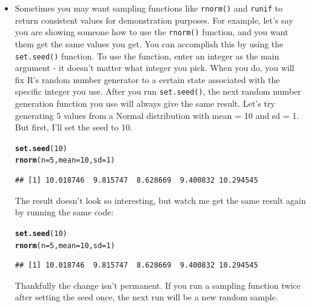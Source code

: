 \documentclass{tufte-book}\usepackage[]{graphicx}\usepackage[]{color}
\makeatletter
\newcommand{\hlnum}[1]{\textcolor[rgb]{0.686,0.059,0.569}{#1}}%
\newcommand{\hlstd}[1]{\textcolor[rgb]{0.345,0.345,0.345}{#1}}%
\newcommand{\hlkwc}[1]{\textcolor[rgb]{0.333,0.667,0.333}{#1}}%
\newcommand{\hlkwd}[1]{\textcolor[rgb]{0.737,0.353,0.396}{\textbf{#1}}}%
\newenvironment{kframe}{%
 \def\at@end@of@kframe{}%
 \ifinner\ifhmode%
  \def\at@end@of@kframe{\end{minipage}}%
  \begin{minipage}{\columnwidth}%
 \fi\fi%
 \def\FrameCommand##1{\hskip\@totalleftmargin \hskip-\fboxsep
 \colorbox{shadecolor}{##1}\hskip-\fboxsep
     \hskip-\linewidth \hskip-\@totalleftmargin \hskip\columnwidth}%
 \MakeFramed {\advance\hsize-\width
   \@totalleftmargin\z@ \linewidth\hsize
   \@setminipage}}%
 {\par\unskip\endMakeFramed%
 \at@end@of@kframe}
\newenvironment{knitrout}{}{} %
\makeatother
\begin{document}
\begin{itemize}


\item Sometimes you may want sampling functions like \texttt{rnorm()} and \texttt{runif} to return consistent values for demonstration purposes. For example, let's say you are showing someone how to use the \texttt{rnorm()} function, and you want them get the same values you get. You can accomplish this by using the \texttt{set.seed()} function. To use the function, enter an integer as the main argument - it doesn't matter what integer you pick. When you do, you will fix R's random number generator to a certain state associated with the specific integer you use. After you run \texttt{set.seed()}, the next random number generation function you use will always give the same result. Let's try generating 5 values from a Normal distribution with mean = 10 and sd = 1. But first, I'll set the seed to 10.

\begin{knitrout}
\color{fgcolor}\begin{kframe}
\begin{alltt}
\hlkwd{set.seed}\hlstd{(}\hlnum{10}\hlstd{)}
\hlkwd{rnorm}\hlstd{(}\hlkwc{n} \hlstd{=} \hlnum{5}\hlstd{,} \hlkwc{mean} \hlstd{=} \hlnum{10}\hlstd{,} \hlkwc{sd} \hlstd{=} \hlnum{1}\hlstd{)}
\end{alltt}
\begin{verbatim}
## [1] 10.018746  9.815747  8.628669  9.400832 10.294545
\end{verbatim}
\end{kframe}
\end{knitrout}

The result doesn't look so interesting, but watch me get the same result again by running the same code:

\begin{knitrout}
\color{fgcolor}\begin{kframe}
\begin{alltt}
\hlkwd{set.seed}\hlstd{(}\hlnum{10}\hlstd{)}
\hlkwd{rnorm}\hlstd{(}\hlkwc{n} \hlstd{=} \hlnum{5}\hlstd{,} \hlkwc{mean} \hlstd{=} \hlnum{10}\hlstd{,} \hlkwc{sd} \hlstd{=} \hlnum{1}\hlstd{)}
\end{alltt}
\begin{verbatim}
## [1] 10.018746  9.815747  8.628669  9.400832 10.294545
\end{verbatim}
\end{kframe}
\end{knitrout}

Thankfully the change isn't permanent. If you run a sampling function twice after setting the seed once, the next run will be a new random sample.


\end{itemize}
\end{document}
